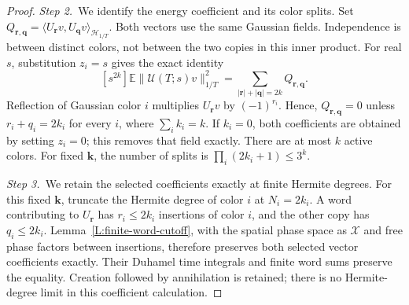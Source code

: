 \documentclass[12pt,oneside,openany]{book}
\numberwithin{equation}{section}
\theoremstyle{nogostyle}
\theoremstyle{definition}
\newcommand{\E}{\mathbb{E}}
\begin{document}
\begin{proof}
  \medskip
  \noindent\textit{Step 2.~}We identify the energy coefficient and its color
  splits.
  Set $Q_{\boldsymbol r,\boldsymbol q} = \langle U_{\boldsymbol
  r}v,U_{\boldsymbol q}v \rangle_{\mathcal{H}_{1/T}}$. Both vectors use the same
  Gaussian fields. Independence is between distinct colors, not between the two
  copies in this inner product. For real $s$, substitution $z_i = s$ gives the
  exact identity
  \begin{equation}\label{E:interval-energy-splits}
    [s^{2k}]\E\|\mathcal{U}(T;s)v\|_{1/T}^2
    =\sum_{|\boldsymbol r|+|\boldsymbol q|=2k}
    Q_{\boldsymbol r,\boldsymbol q}.
  \end{equation}
  Reflection of Gaussian color $i$ multiplies $U_{\boldsymbol r}v$ by
  $(-1)^{r_i}$. Hence, $Q_{\boldsymbol r,\boldsymbol q} = 0$ unless $r_i+q_i =
  2k_i$ for every $i$, where $\sum_i k_i = k$. If $k_i = 0$, both coefficients
  are obtained by setting $z_i = 0$; this removes that field exactly. There are
  at most $k$ active colors. For fixed $\boldsymbol k$, the number of splits is
  $\prod_i(2k_i+1) \le 3^k$.


  \medskip
  \noindent\textit{Step 3.~}We retain the selected coefficients exactly at
  finite Hermite degrees.
  For this fixed $\boldsymbol k$, truncate the Hermite degree of color $i$ at
  $N_i = 2k_i$. A word contributing to $U_{\boldsymbol r}$ has $r_i \le 2k_i$
  insertions of color $i$, and the other copy has $q_i \le 2k_i$.
  Lemma~\ref{L:finite-word-cutoff}, with the spatial phase space as
  $\mathscr{X}$ and free phase factors between insertions, therefore preserves
  both selected vector coefficients exactly. Their Duhamel time integrals and
  finite word sums preserve the equality. Creation followed by annihilation is
  retained; there is no Hermite-degree limit in this coefficient calculation.



\end{proof}
\end{document}
